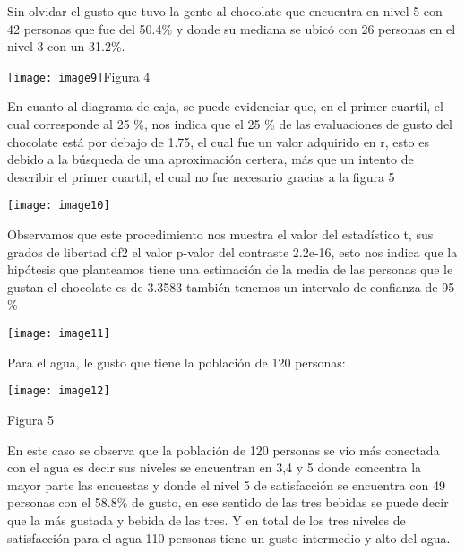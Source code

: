 \documentclass{article} %
\begin{document}
\noindent Sin olvidar el gusto que tuvo la gente al chocolate que encuentra en nivel 5 con 42 personas que fue del 50.4\% y donde su mediana se ubic\'{o} con 26 personas en el nivel 3 con un 31.2\%.

\noindent 

\noindent 

\noindent \texttt{[image: image9]}Figura 4

\noindent 

\noindent En cuanto al diagrama de caja, se puede evidenciar que, en el primer cuartil, el cual corresponde al 25 \%, nos indica que el 25 \% de las evaluaciones de gusto del chocolate est\'{a} por debajo de 1.75, el cual fue un valor adquirido en r, esto es debido a la b\'{u}squeda de una aproximaci\'{o}n certera, m\'{a}s que un intento de describir el primer cuartil, el cual no fue necesario gracias a la figura 5

\noindent 

\noindent \texttt{[image: image10]}

\noindent 

\noindent Observamos que este procedimiento nos muestra el valor del estad\'{i}stico t, sus grados de libertad df2 el valor p-valor del contraste 2.2e-16, esto nos indica que la hip\'{o}tesis que planteamos tiene una estimaci\'{o}n de la media de las personas que le gustan el chocolate es de 3.3583 tambi\'{e}n tenemos un intervalo de confianza de 95 \%

\noindent \texttt{[image: image11]}

\noindent 

\noindent Para el agua, le gusto que tiene la poblaci\'{o}n de 120 personas:

\noindent \texttt{[image: image12]}

\noindent \textbf{}

\noindent \textbf{}

\noindent \textbf{}

\noindent \textbf{}

\noindent \textbf{}

\noindent \textbf{}

\noindent Figura 5

\noindent En este caso se observa que la poblaci\'{o}n de 120 personas se vio m\'{a}s conectada con el agua es decir sus niveles se encuentran en 3,4 y 5 donde concentra la mayor parte las encuestas y donde el nivel 5 de satisfacci\'{o}n se encuentra con 49 personas con el 58.8\% de gusto, en ese sentido de las tres bebidas se puede decir que la m\'{a}s gustada y bebida de las tres.  Y en total de los tres niveles de satisfacci\'{o}n para el agua 110 personas tiene un gusto intermedio y alto del agua.
\end{document}
